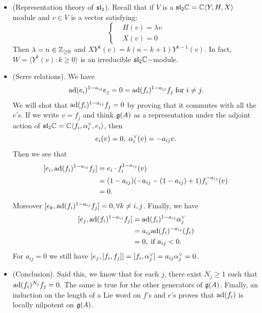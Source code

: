 \begin{itemize}
    \item(Representation theory of $\mathfrak{sl}_2$). Recall that if $V$ is a $\mathfrak{sl}_2\mathbb{C}=\mathbb{C}\langle Y,H,X\rangle$
    module and $v\in V$ is a vector satisfying:
    \begin{equation}
        \left\{\begin{aligned}
            &H(v) = \lambda v\\
            &X(v) = 0
        \end{aligned}\right.
    \end{equation}
    Then $\lambda = n\in\mathbb{Z}_{\geq0}$ and $XY^k(v) = k(n - k + 1)Y^{k-1}(v)$. In fact, $W = \langle Y^k(v):k\geq0 \rangle $
    is an irreducible $\mathfrak{sl}_2\mathbb{C}-$module.
    \item(Serre relations). We have 
    \begin{equation}
        \text{ad}(e_i)^{1-a_{ij}}e_j = 0 = \text{ad}(f_i)^{1 - a_{ij}}f_j\;\text{for }i\neq j.
    \end{equation}
    We will shot that $\text{ad}(f_i)^{1 - a_{ij}}f_j = 0$ by proving that it commutes with all the $e$'s. If we write 
    $v = f_j$ and think $\mathfrak{g}(A)$ as a representation under the adjoint action of 
    $\mathfrak{sl}_2\mathbb{C} = \mathbb{C}\langle f_i, \alpha^{\vee}_i, e_i\rangle$, then 
    \begin{equation}
        e_i(v) = 0,\; \alpha^{\vee}_i(v) = -a_{ij}v.  
    \end{equation}  
    Then we see that 
    \begin{equation}
        \begin{split}
            [e_i, \text{ad}(f_i)^{1 - a_{ij}}f_j] &= e_i\cdot f_i^{1-a_{ij}}(v)\\ 
            &= (1 - a_{ij}) ( - a_{ij}  - (1 - a_{ij}) + 1)f_{i}^{ - a_{ij}} (v)\\
            &= 0. 
        \end{split}
    \end{equation}
    Moreover $[e_k, \text{ad}(f_i)^{1 - a_{ij}}f_j] = 0,\forall k\neq i,j$. Finally, we have
    \begin{equation}
        \begin{split}
             [e_j, \text{ad}(f_i)^{1 - a_{ij}}f_j] &= \text{ad}(f_i)^{1-a_{ij}}\alpha^{\vee}_j\\
             &= a_{ij}\text{ad}(f_i)^{-a_{ij}}(f_i)\\
             &= 0,\;\text{if }a_{ij} < 0. 
        \end{split}
    \end{equation}
    For $a_{ij} = 0$ we still have $[e_j, [f_i,f_j]] = [f_i, \alpha^{\vee}_j] = a_{ij}\alpha^{\vee}_j = 0$.
    \item(Conclusion). Said this, we know that for each $j$, there exist $N_j\geq1$ such that 
    $\text{ad}(f_i)^{N_j}f_j = 0$. The same is true for the other generators of $\mathfrak{g}(A)$. Finally, an induction on the length
    of a Lie word on $f$'s and $e$'s proves that $\text{ad}(f_i)$ is locally nilpotent on $\mathfrak{g}(A)$.
\end{itemize}

